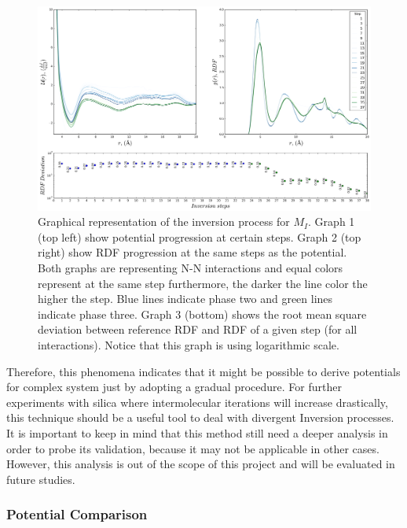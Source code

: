 \documentclass[10pt,a4paper,twoside]{article}
\begin{document}
\begin{figure}[H]
  \begin{center}
	\includegraphics[width=1 \textwidth]{./graphs/ConvHigh}
	\caption{Graphical representation of the inversion process for $M_I$. Graph 1 (top left) show potential progression at certain steps. Graph 2 (top right) show RDF progression at the same steps as the potential. Both graphs are representing N-N interactions and equal colors represent at the same step furthermore, the darker the line color the higher the step. Blue lines indicate phase two and green lines indicate phase three.  Graph 3 (bottom) shows the root mean square deviation between reference RDF and RDF of a given step (for all interactions). Notice that this graph is using logarithmic scale.}
	\label{Fig:convHigh}
  \end{center}
\end{figure} 

Therefore, this phenomena indicates that it might be possible to derive potentials for complex system just by adopting a gradual procedure. For further experiments with silica where intermolecular iterations will increase drastically, this technique should be a useful tool to deal with divergent Inversion processes. It is important to keep in mind that this method still need a deeper analysis in order to probe its validation, because it may not be applicable in other cases. However, this analysis is out of the scope of this project and will be evaluated in future studies.

\subsubsection{Potential Comparison}
\end{document}
